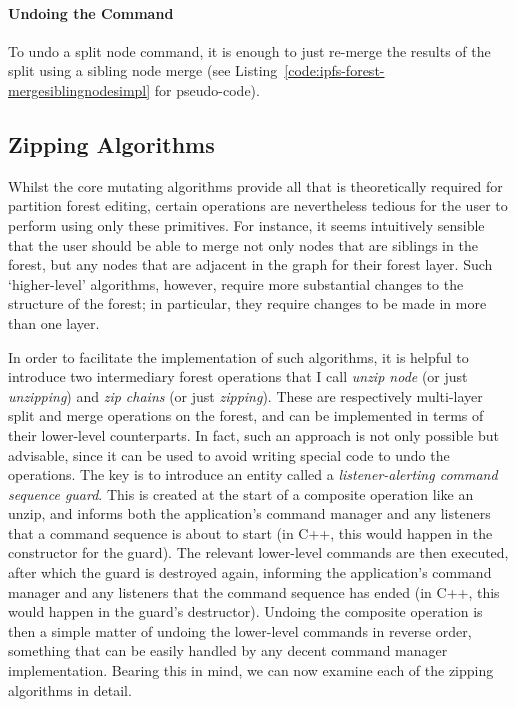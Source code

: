 \paragraph{Undoing the Command}

To undo a split node command, it is enough to just re-merge the results of the split using a sibling node merge (see Listing~\ref{code:ipfs-forest-mergesiblingnodesimpl} for pseudo-code).

\afterpage{\clearpage}
\newpage

\subsection{Zipping Algorithms}

Whilst the core mutating algorithms provide all that is theoretically required for partition forest editing, certain operations are nevertheless tedious for the user to perform using only these primitives. For instance, it seems intuitively sensible that the user should be able to merge not only nodes that are siblings in the forest, but any nodes that are adjacent in the graph for their forest layer. Such `higher-level' algorithms, however, require more substantial changes to the structure of the forest; in particular, they require changes to be made in more than one layer.

In order to facilitate the implementation of such algorithms, it is helpful to introduce two intermediary forest operations that I call \emph{unzip node} (or just \emph{unzipping}) and \emph{zip chains} (or just \emph{zipping}). These are respectively multi-layer split and merge operations on the forest, and can be implemented in terms of their lower-level counterparts. In fact, such an approach is not only possible but advisable, since it can be used to avoid writing special code to undo the operations. The key is to introduce an entity called a \emph{listener-alerting command sequence guard}. This is created at the start of a composite operation like an unzip, and informs both the application's command manager and any listeners that a command sequence is about to start (in C++, this would happen in the constructor for the guard). The relevant lower-level commands are then executed, after which the guard is destroyed again, informing the application's command manager and any listeners that the command sequence has ended (in C++, this would happen in the guard's destructor). Undoing the composite operation is then a simple matter of undoing the lower-level commands in reverse order, something that can be easily handled by any decent command manager implementation. Bearing this in mind, we can now examine each of the zipping algorithms in detail.

